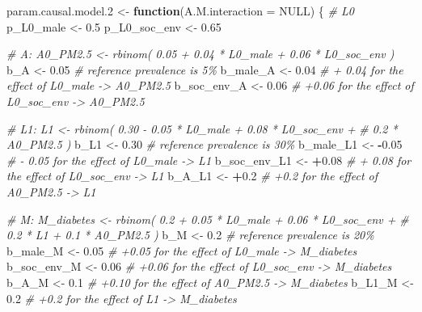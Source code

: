 \documentclass[
]{book}
\newenvironment{Shaded}{\begin{snugshade}}{\end{snugshade}}
\newcommand{\AttributeTok}[1]{\textcolor[rgb]{0.13,0.29,0.53}{#1}}
\newcommand{\CommentTok}[1]{\textcolor[rgb]{0.56,0.35,0.01}{\textit{#1}}}
\newcommand{\ConstantTok}[1]{\textcolor[rgb]{0.56,0.35,0.01}{#1}}
\newcommand{\ControlFlowTok}[1]{\textcolor[rgb]{0.13,0.29,0.53}{\textbf{#1}}}
\newcommand{\FloatTok}[1]{\textcolor[rgb]{0.00,0.00,0.81}{#1}}
\newcommand{\NormalTok}[1]{#1}
\newcommand{\OtherTok}[1]{\textcolor[rgb]{0.56,0.35,0.01}{#1}}
\newcommand{\SpecialCharTok}[1]{\textcolor[rgb]{0.81,0.36,0.00}{\textbf{#1}}}
\begin{document}
\begin{Shaded}
\begin{Highlighting}[]
\NormalTok{param.causal.model}\FloatTok{.2} \OtherTok{\textless{}{-}} \ControlFlowTok{function}\NormalTok{(}\AttributeTok{A.M.interaction =} \ConstantTok{NULL}\NormalTok{) \{}
\CommentTok{\# L0}
\NormalTok{p\_L0\_male }\OtherTok{\textless{}{-}} \FloatTok{0.5}
\NormalTok{p\_L0\_soc\_env }\OtherTok{\textless{}{-}} \FloatTok{0.65}

\CommentTok{\# A: A0\_PM2.5 \textless{}{-} rbinom( 0.05 + 0.04 * L0\_male + 0.06 * L0\_soc\_env ) }
\NormalTok{b\_A }\OtherTok{\textless{}{-}} \FloatTok{0.05}   \CommentTok{\# reference prevalence is 5\%}
\NormalTok{b\_male\_A }\OtherTok{\textless{}{-}} \FloatTok{0.04}  \CommentTok{\# + 0.04 for the effect of L0\_male {-}\textgreater{} A0\_PM2.5}
\NormalTok{b\_soc\_env\_A }\OtherTok{\textless{}{-}} \FloatTok{0.06}  \CommentTok{\# +0.06 for the effect of L0\_soc\_env {-}\textgreater{} A0\_PM2.5}

\CommentTok{\# L1: L1 \textless{}{-} rbinom( 0.30 {-} 0.05 * L0\_male + 0.08 * L0\_soc\_env + }
\CommentTok{\#                   0.2 * A0\_PM2.5 ) }
\NormalTok{b\_L1 }\OtherTok{\textless{}{-}} \FloatTok{0.30}   \CommentTok{\# reference prevalence is 30\%}
\NormalTok{b\_male\_L1 }\OtherTok{\textless{}{-}} \SpecialCharTok{{-}}\FloatTok{0.05}  \CommentTok{\# {-} 0.05 for the effect of L0\_male {-}\textgreater{} L1}
\NormalTok{b\_soc\_env\_L1 }\OtherTok{\textless{}{-}} \SpecialCharTok{+}\FloatTok{0.08} \CommentTok{\# + 0.08 for the effect of L0\_soc\_env {-}\textgreater{} L1}
\NormalTok{b\_A\_L1 }\OtherTok{\textless{}{-}} \SpecialCharTok{+}\FloatTok{0.2} \CommentTok{\# +0.2 for the effect of A0\_PM2.5 {-}\textgreater{} L1}

\CommentTok{\# M: M\_diabetes \textless{}{-} rbinom( 0.2 + 0.05 * L0\_male + 0.06 * L0\_soc\_env + }
\CommentTok{\#                         0.2 * L1 + 0.1 * A0\_PM2.5 ) }
\NormalTok{b\_M }\OtherTok{\textless{}{-}} \FloatTok{0.2} \CommentTok{\# reference prevalence is 20\%}
\NormalTok{b\_male\_M }\OtherTok{\textless{}{-}} \FloatTok{0.05} \CommentTok{\# +0.05 for the effect of L0\_male {-}\textgreater{} M\_diabetes}
\NormalTok{b\_soc\_env\_M }\OtherTok{\textless{}{-}} \FloatTok{0.06} \CommentTok{\# +0.06 for the effect of L0\_soc\_env {-}\textgreater{} M\_diabetes}
\NormalTok{b\_A\_M }\OtherTok{\textless{}{-}} \FloatTok{0.1} \CommentTok{\# +0.10 for the effect of A0\_PM2.5 {-}\textgreater{} M\_diabetes}
\NormalTok{b\_L1\_M }\OtherTok{\textless{}{-}} \FloatTok{0.2} \CommentTok{\# +0.2 for the effect of L1 {-}\textgreater{} M\_diabetes}


\end{Highlighting}
\end{Shaded}
\end{document}
